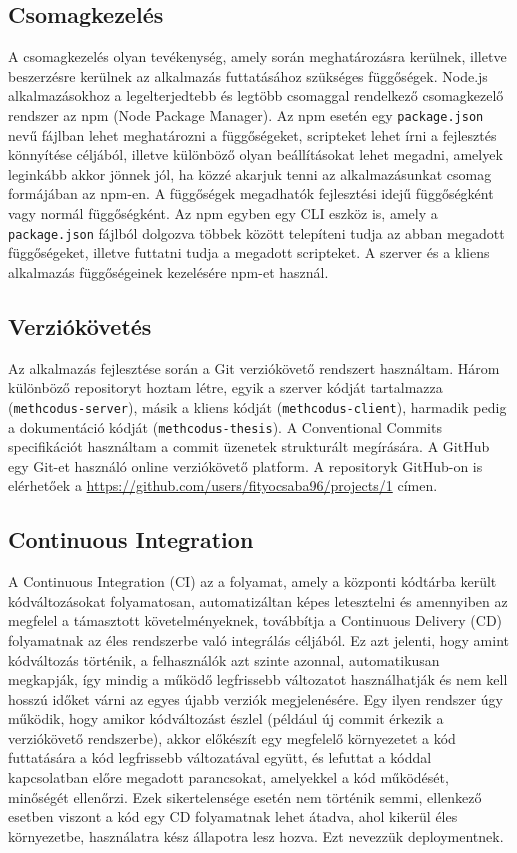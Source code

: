 \documentclass{elteikthesis}
\begin{document}
			\subsection{Csomagkezelés}
				A csomagkezelés olyan tevékenység, amely során meghatározásra kerülnek, illetve beszerzésre kerülnek az alkalmazás futtatásához szükséges függőségek. Node.js alkalmazásokhoz a legelterjedtebb és legtöbb csomaggal rendelkező csomagkezelő rendszer az npm (Node Package Manager). Az npm esetén egy \texttt{package.json} nevű fájlban lehet meghatározni a függőségeket, scripteket lehet írni a fejlesztés könnyítése céljából, illetve különböző olyan beállításokat lehet megadni, amelyek leginkább akkor jönnek jól, ha közzé akarjuk tenni az alkalmazásunkat csomag formájában az npm-en. A függőségek megadhatók fejlesztési idejű függőségként vagy normál függőségként. Az npm egyben egy CLI eszköz is, amely a \texttt{package.json} fájlból dolgozva többek között telepíteni tudja az abban megadott függőségeket, illetve futtatni tudja a megadott scripteket. A szerver és a kliens alkalmazás függőségeinek kezelésére npm-et használ.
			
			\subsection{Verziókövetés}
				Az alkalmazás fejlesztése során a Git verziókövető rendszert használtam. Három különböző repositoryt hoztam létre, egyik a szerver kódját tartalmazza (\texttt{methcodus-server}), másik a kliens kódját (\texttt{methcodus-client}), harmadik pedig a dokumentáció kódját (\texttt{methcodus-thesis}). A Conventional Commits specifikációt használtam a commit üzenetek strukturált megírására. A GitHub egy Git-et használó online verziókövető platform. A repositoryk GitHub-on is elérhetőek a \url{https://github.com/users/fityocsaba96/projects/1} címen.
			
			\subsection{Continuous Integration}
				A Continuous Integration (CI) az a folyamat, amely a központi kódtárba került kódváltozásokat folyamatosan, automatizáltan képes letesztelni és amennyiben az megfelel a támasztott követelményeknek, továbbítja a Continuous Delivery (CD) folyamatnak az éles rendszerbe való integrálás céljából. Ez azt jelenti, hogy amint kódváltozás történik, a felhasználók azt szinte azonnal, automatikusan megkapják, így mindig a működő legfrissebb változatot használhatják és nem kell hosszú időket várni az egyes újabb verziók megjelenésére. Egy ilyen rendszer úgy működik, hogy amikor kódváltozást észlel (például új commit érkezik a verziókövető rendszerbe), akkor előkészít egy megfelelő környezetet a kód futtatására a kód legfrissebb változatával együtt, és lefuttat a kóddal kapcsolatban előre megadott parancsokat, amelyekkel a kód működését, minőségét ellenőrzi. Ezek sikertelensége esetén nem történik semmi, ellenkező esetben viszont a kód egy CD folyamatnak lehet átadva, ahol kikerül éles környezetbe, használatra kész állapotra lesz hozva. Ezt nevezzük deploymentnek.
\end{document}

